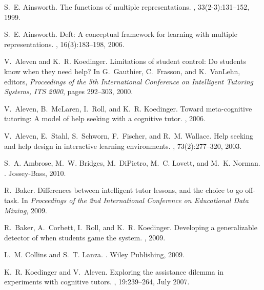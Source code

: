 \documentclass{edm_template}
\begin{document}

%
\begin{thebibliography}{10}

S.~E. Ainsworth.
\newblock The functions of multiple representations.
, 33(2-3):131--152, 1999.

S.~E. Ainsworth.
\newblock Deft: A conceptual framework for learning with multiple
  representations.
, 16(3):183--198, 2006.

V.~Aleven and K.~R. Koedinger.
\newblock Limitations of student control: Do students know when they need help?
\newblock In G.~Gauthier, C.~Frasson, and K.~VanLehn, editors, {\em Proceedings
  of the 5th International Conference on Intelligent Tutoring Systems, ITS
  2000}, pages 292--303, 2000.

V.~Aleven, B.~McLaren, I.~Roll, and K.~R. Koedinger.
\newblock Toward meta-cognitive tutoring: A model of help seeking with a
  cognitive tutor.
,
  2006.

V.~Aleven, E.~Stahl, S.~Schworn, F.~Fischer, and R.~M. Wallace.
\newblock Help seeking and help design in interactive learning environments.
, 73(2):277--320, 2003.

S.~A. Ambrose, M.~W. Bridges, M.~DiPietro, M.~C. Lovett, and M.~K. Norman.
.
\newblock Jossey-Bass, 2010.

R.~Baker.
\newblock Differences between intelligent tutor lessons, and the choice to go
  off-task.
\newblock In {\em Proceedings of the 2nd International Conference on
  Educational Data Mining}, 2009.

R.~Baker, A.~Corbett, I.~Roll, and K.~R. Koedinger.
\newblock Developing a generalizable detector of when students game the system.
, 2009.

L.~M. Collins and S.~T. Lanza.
.
\newblock Wiley Publishing, 2009.

K.~R. Koedinger and V.~Aleven.
\newblock Exploring the assistance dilemma in experiments with cognitive
  tutors.
, 19:239--264, July 2007.


\end{thebibliography}
\end{document}
